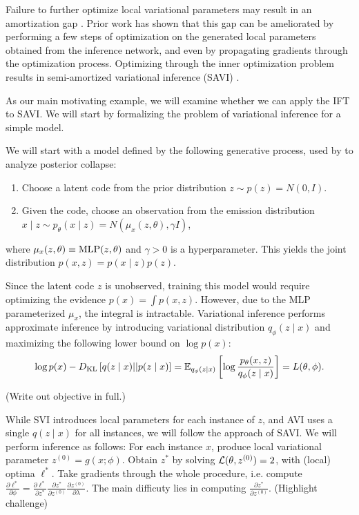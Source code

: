 \documentclass[11pt]{article}
\begin{document}
Failure to further optimize local variational parameters may result in an amortization gap \citep{}.
Prior work has shown that this gap can be ameliorated by performing a few steps of
optimization on the generated local parameters obtained from the inference network,
and even by propagating gradients through the optimization process.
Optimizing through the inner optimization problem results in semi-amortized variational inference
(SAVI) \citep{}.

As our main motivating example, we will examine whether we can apply the IFT to SAVI.
We will start by formalizing the problem of variational inference for a simple model.

We will start with a model defined by the following generative process,
used by \citet{dai2020vae} to analyze posterior collapse:
\begin{enumerate}
\item Choose a latent code from the prior distribution $z \sim p(z) = N(0, I)$.
\item Given the code, choose an observation from the emission distribution
    $x \mid z \sim p_\theta(x \mid z) = N(\mu_x(z, \theta), \gamma I)$,
\end{enumerate}
where $\mu_x(z, \theta) \equiv \mathrm{MLP}(z, \theta)$ and $\gamma > 0$ is a hyperparameter.
This yields the joint distribution $p(x,z) = p(x\mid z)p(z)$.

Since the latent code $z$ is unobserved, training this model would require optimizing the
evidence $p(x) = \int p(x,z)$.
However, due to the MLP parameterized $\mu_x$, the integral is intractable.
Variational inference performs approximate inference by introducing variational distribution
$q_\phi(z \mid x)$ and maximizing the following lower bound on $\log p(x)$:
\begin{equation}
    \log p(x) - D_\mathrm{KL}\left[q(z \mid x) || p(z \mid x)\right]
    = \mathbb{E}_{q_\phi(z \mid x)}\left[\log \frac{p_\theta(x,z)}{q_\phi(z\mid x)}\right] = L(\theta, \phi).
\end{equation}

(Write out objective in full.)

While SVI introduces local parameters for each instance of $z$,
and AVI uses a single $q(z \mid x)$ for all instances,
we will follow the approach of SAVI.
We will perform inference as follows:
For each instance $x$, produce local variational parameter
$z^{(0)} = g(x; \phi)$.
Obtain $z^*$ by solving $\mathcal{L}(\theta, z^{(0)}) = 2$, with (local) optima $\ell^*$.
Take gradients through the whole procedure,
i.e. compute $\frac{\partial \ell^*}{\partial \phi}
= \frac{\partial\ell^*}{\partial z^*}\frac{\partial z^*}{\partial z^{(0)}}
\frac{\partial z^{(0)}}{\partial \lambda}$.
The main difficuty lies in computing $\frac{\partial z^*}{\partial z^{(0)}}$.
(Highlight challenge)
\end{document}
